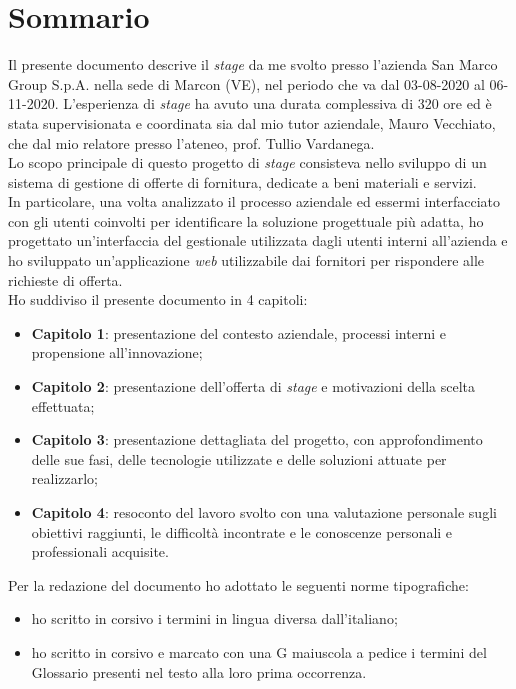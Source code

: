 
\cleardoublepage
{}
{}
\begingroup
\let\clearpage\relax
\let\cleardoublepage\relax
\let\cleardoublepage\relax

\chapter*{Sommario}

Il presente documento descrive il \textit{stage} da me svolto presso l'azienda San Marco Group S.p.A. nella sede di Marcon (VE), nel periodo che va dal 03-08-2020 al 06-11-2020. L'esperienza di \textit{stage} ha avuto una durata complessiva di 320 ore ed è stata supervisionata e coordinata sia dal mio tutor aziendale, Mauro Vecchiato, che dal mio relatore presso l'ateneo, prof. Tullio Vardanega.\\
Lo scopo principale di questo progetto di \textit{stage} consisteva nello sviluppo di un sistema di gestione di offerte di fornitura, dedicate a beni materiali e servizi.\\
In particolare, una volta analizzato il processo aziendale ed essermi interfacciato con gli utenti coinvolti per identificare la soluzione progettuale più adatta, ho progettato un'interfaccia del gestionale utilizzata dagli utenti interni all'azienda e ho sviluppato un'applicazione \textit{web} utilizzabile dai fornitori per rispondere alle richieste di offerta.\\
Ho suddiviso il presente documento in 4 capitoli:
\begin{itemize}
	\item \textbf{Capitolo 1}: presentazione del contesto aziendale, processi interni e propensione all'innovazione;
	\item \textbf{Capitolo 2}: presentazione dell'offerta di \textit{stage} e motivazioni della scelta effettuata; 
	\item \textbf{Capitolo 3}: presentazione dettagliata del progetto, con approfondimento delle sue fasi, delle tecnologie utilizzate e delle soluzioni attuate per realizzarlo;
	\item \textbf{Capitolo 4}: resoconto del lavoro svolto con una valutazione personale sugli obiettivi raggiunti, le difficoltà incontrate e le conoscenze personali e professionali acquisite.
\end{itemize}
Per la redazione del documento ho adottato le seguenti norme tipografiche:
\begin{itemize}
\item ho scritto in corsivo i termini in lingua diversa dall'italiano;
\item ho scritto in corsivo e marcato con una G maiuscola a pedice i termini del Glossario presenti nel testo alla loro prima occorrenza.
\end{itemize}

\vfill
%
%

\endgroup			

\vfill

